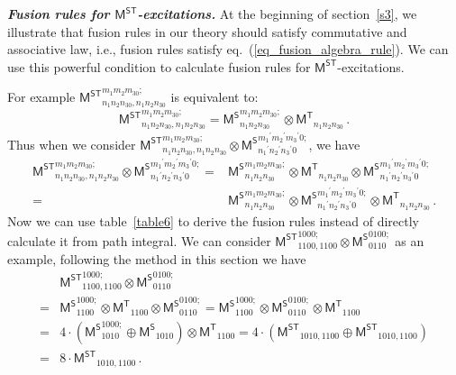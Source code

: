 \documentclass[11pt,nofootinbib,preprint]{revtex4-1}
\begin{document}
\textbf{\textit{Fusion rules for $\mathsf{M^{ST}}$-excitations.}}
At the beginning of section~\ref{s3}, we illustrate that fusion rules in our theory should satisfy commutative and associative law, i.e., fusion rules satisfy eq.~(\ref{eq_fusion_algebra_rule}). We can use this powerful condition to calculate fusion rules for $\mathsf{M^{ST}}$-excitations. 

For example ${\mathsf{M}^{\mathsf{ST}}}_{n_1n_2n_30,n_1n_2n_30}^{m_1m_2m_30;}$ is equivalent to:
\begin{align}
	{\mathsf{M}^{\mathsf{ST}}}_{n_1n_2n_30,n_1n_2n_30}^{m_1m_2m_30;}={\mathsf{M}^{\mathsf{S}}}_{n_1n_2n_30}^{m_1m_2m_30;}\otimes {\mathsf{M}^{\mathsf{T}}}_{n_1n_2n_30} \,.
\end{align}
Thus when we consider ${\mathsf{M}^{\mathsf{ST}}}_{n_1n_2n_30,n_1n_2n_30}^{m_1m_2m_30;}\otimes {\mathsf{M}^{\mathsf{S}}}_{{n_1}^{\prime}{n_2}^{\prime}{n_3}^{\prime}0}^{{m_1}^{\prime}{m_2}^{\prime}{m_3}^{\prime}0;}$, we have 
\begin{align}
	{\mathsf{M}^{\mathsf{ST}}}_{n_1n_2n_30,n_1n_2n_30}^{m_1m_2m_30;}\otimes {\mathsf{M}^{\mathsf{S}}}_{{n_1}^{\prime}{n_2}^{\prime}{n_3}^{\prime}0}^{{m_1}^{\prime}{m_2}^{\prime}{m_3}^{\prime}0;}=&{\mathsf{M}^{\mathsf{S}}}_{n_1n_2n_30}^{m_1m_2m_30;}\otimes {\mathsf{M}^{\mathsf{T}}}_{n_1n_2n_30}\otimes {\mathsf{M}^{\mathsf{S}}}_{{n_1}^{\prime}{n_2}^{\prime}{n_3}^{\prime}0}^{{m_1}^{\prime}{m_2}^{\prime}{m_3}^{\prime}0;}\nonumber
	\\
	=&{\mathsf{M}^{\mathsf{S}}}_{n_1n_2n_30}^{m_1m_2m_30;}\otimes {\mathsf{M}^{\mathsf{S}}}_{{n_1}^{\prime}{n_2}^{\prime}{n_3}^{\prime}0}^{{m_1}^{\prime}{m_2}^{\prime}{m_3}^{\prime}0;}\otimes {\mathsf{M}^{\mathsf{T}}}_{n_1n_2n_30}	\,.
\end{align}
Now we can use table~\ref{table6} to derive the fusion rules instead of directly calculate it from path integral. We can consider $\mathsf{M^{ST}}_{1100,1100}^{1000;}\otimes \mathsf{M^S}_{0110}^{0100;}$ as an example, following the method in this section we have 
\begin{align}
	&\mathsf{M^{ST}}_{1100,1100}^{1000;}\otimes \mathsf{M^S}_{0110}^{0100;}\nonumber
	\\
	=&\mathsf{M^S}_{1100}^{1000;}\otimes \mathsf{M^T}_{1100}\otimes \mathsf{M^S}_{0110}^{0100;}=\mathsf{M^S}_{1100}^{1000;}\otimes \mathsf{M^S}_{0110}^{0100;}\otimes \mathsf{M^T}_{1100} \nonumber
	\\
	=&4\cdot \left( \mathsf{M^S}_{1010}^{1000;}\oplus \mathsf{M^S}_{1010} \right) \otimes \mathsf{M^T}_{1100}=4\cdot \left( \mathsf{M^{ST}}_{1010,1100}\oplus \mathsf{M^{ST}}_{1010,1100} \right) \nonumber
	\\
	=&8\cdot \mathsf{M^{ST}}_{1010,1100}\,.
\end{align}
\end{document}
